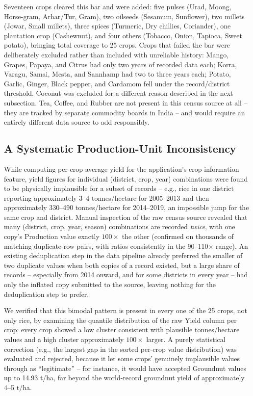 \documentclass[conference]{IEEEtran}
\begin{document}
Seventeen crops cleared this bar and were added: five pulses (Urad, Moong,
Horse-gram, Arhar/Tur, Gram), two oilseeds (Sesamum, Sunflower), two millets (Jowar,
Small millets), three spices (Turmeric, Dry chillies, Coriander), one plantation crop
(Cashewnut), and four others (Tobacco, Onion, Tapioca, Sweet potato), bringing total
coverage to 25 crops. Crops that failed the bar were deliberately excluded rather than
included with unreliable history: Mango, Grapes, Papaya, and Citrus had only two years
of recorded data each; Korra, Varagu, Samai, Mesta, and Sannhamp had two to three
years each; Potato, Garlic, Ginger, Black pepper, and Cardamom fell under the
record/district threshold. Coconut was excluded for a different reason described in
the next subsection. Tea, Coffee, and Rubber are not present in this census source at
all -- they are tracked by separate commodity boards in India -- and would require an
entirely different data source to add responsibly.

\subsection{A Systematic Production-Unit Inconsistency}

While computing per-crop average yield for the application's crop-information
feature, yield figures for individual (district, crop, year) combinations were found
to be physically implausible for a subset of records -- e.g., rice in one district
reporting approximately 3--4 tonnes/hectare for 2005--2013 and then approximately
330--490 tonnes/hectare for 2014--2019, an impossible jump for the same crop and
district. Manual inspection of the raw census source revealed that many
(district, crop, year, season) combinations are recorded \emph{twice}, with one copy's
Production value exactly $100\times$ the other (confirmed on thousands of matching
duplicate-row pairs, with ratios consistently in the 90--110$\times$ range). An
existing deduplication step in the data pipeline already preferred the smaller of two
duplicate values when both copies of a record existed, but a large share of records
-- especially from 2014 onward, and for some districts in every year -- had only the
inflated copy submitted to the source, leaving nothing for the deduplication step to
prefer.

We verified that this bimodal pattern is present in every one of the 25 crops, not
only rice, by examining the quantile distribution of the raw Yield column per crop:
every crop showed a low cluster consistent with plausible tonnes/hectare values and a
high cluster approximately $100\times$ larger. A purely statistical correction (e.g.,
the largest gap in the sorted per-crop value distribution) was evaluated and rejected,
because it let some crops' genuinely implausible values through as ``legitimate'' --
for instance, it would have accepted Groundnut values up to 14.93 t/ha, far beyond the
world-record groundnut yield of approximately 4--5 t/ha.
\end{document}

